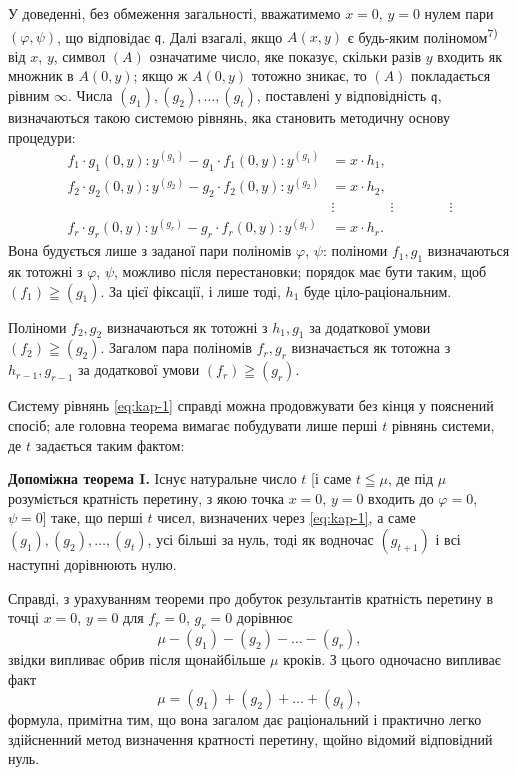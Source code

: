 \documentclass[11pt]{article}
\theoremstyle{plain}
\begin{document}
У доведенні, без обмеження загальності, вважатимемо $x = 0$,
$y = 0$ нулем пари $(\varphi, \psi)$, що відповідає
$\mathfrak{q}$. Далі взагалі, якщо $A(x,y)$ є будь-яким
поліномом\textsuperscript{7)} від $x$, $y$, символ $(A)$ означатиме
число, яке показує, скільки разів $y$ входить як множник в $A(0,y)$;
якщо ж $A(0,y)$ тотожно зникає, то $(A)$ покладається рівним
$\infty$. Числа $(g_{1}), (g_{2}), \ldots, (g_{t})$, поставлені у
відповідність $\mathfrak{q}$, визначаються такою системою рівнянь,
яка становить методичну основу процедури:
\begin{equation}\label{eq:kap-1}
\begin{aligned}
f_{1} \cdot g_{1}(0,y):y^{(g_{1})} - g_{1} \cdot f_{1}(0,y):y^{(g_{1})} &= x \cdot h_{1},\\
f_{2} \cdot g_{2}(0,y):y^{(g_{2})} - g_{2} \cdot f_{2}(0,y):y^{(g_{2})} &= x \cdot h_{2},\\
&\vdots \qquad\qquad\vdots\qquad\qquad\vdots\\
f_{r} \cdot g_{r}(0,y):y^{(g_{r})} - g_{r} \cdot f_{r}(0,y):y^{(g_{r})} &= x \cdot h_{r}.
\end{aligned}
\end{equation}
Вона будується лише з заданої пари поліномів $\varphi$, $\psi$:
поліноми $f_{1}, g_{1}$ визначаються як тотожні з $\varphi$, $\psi$,
можливо після перестановки; порядок має бути таким, щоб
$(f_1)\geqq(g_1)$. За цієї фіксації, і лише тоді, $h_{1}$ буде
ціло-раціональним.

Поліноми $f_{2}, g_{2}$ визначаються як тотожні з $h_{1}, g_{1}$ за
додаткової умови $(f_2)\geqq(g_2)$. Загалом пара поліномів
$f_{r}, g_{r}$ визначається як тотожна з $h_{r-1}, g_{r-1}$ за
додаткової умови $(f_r)\geqq(g_r)$.

Систему рівнянь \eqref{eq:kap-1} справді можна продовжувати без кінця
у пояснений спосіб; але головна теорема вимагає побудувати лише
перші $t$ рівнянь системи, де $t$ задається таким фактом:

\smallskip
\textbf{Допоміжна теорема I.} Існує натуральне число $t$ [і саме
$t\leqq\mu$, де під $\mu$ розуміється кратність перетину, з якою
точка $x = 0$, $y = 0$ входить до $\varphi = 0$, $\psi = 0$] таке, що
перші $t$ чисел, визначених через \eqref{eq:kap-1}, а саме
$(g_{1}), (g_{2}), \ldots, (g_{t})$, усі більші за нуль, тоді як
водночас $(g_{t+1})$ і всі наступні дорівнюють нулю.

Справді, з урахуванням теореми про добуток результантів кратність
перетину в точці $x = 0$, $y = 0$ для $f_{r} = 0$, $g_{r} = 0$
дорівнює
\[
\mu-(g_1)-(g_2)-\ldots-(g_r),
\]
звідки випливає обрив після щонайбільше $\mu$ кроків. З цього
одночасно випливає факт
\begin{equation}\label{eq:kap-2}
\mu=(g_1)+(g_2)+\ldots+(g_t),
\end{equation}
формула, примітна тим, що вона загалом дає раціональний і практично
легко здійсненний метод визначення кратності перетину, щойно відомий
відповідний нуль.
\end{document}
